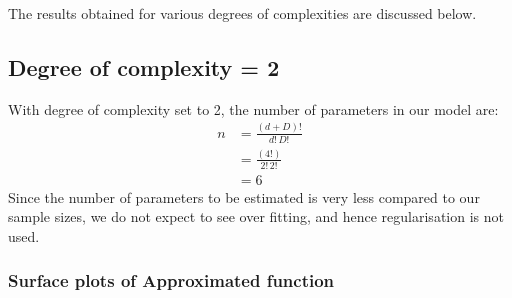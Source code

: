\documentclass[12pt,a4paper]{article}
\newcommand{\noi}{\noindent}
\begin{document}
The results obtained for various degrees of complexities are discussed below. 

\subsection{Degree of complexity = 2}

With degree of complexity set to 2, the number of parameters in our model are:
\begin{equation}
\begin{split}
 n &= \frac{(d+D)!}{d!\,D!} \\
   & =\frac{(4!)}{2!\,2!} \\
   & =6
\end{split}
\end{equation}
\noi
Since the number of parameters to be estimated is very less compared to our sample sizes, we do not expect to see over fitting, and hence regularisation is not used. 

\subsubsection{Surface plots of Approximated function}
\end{document}
